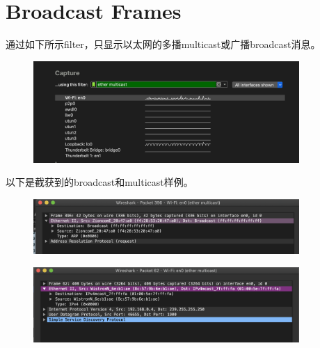 \documentclass{article}
\begin{document}
    \section{Broadcast Frames}
    通过如下所示filter，只显示以太网的多播multicast或广播broadcast消息。
    

 \begin{figure}[H]
        \centering
        \includegraphics[width=0.9\textwidth]{img/exp1cast.png}
        \caption{}
        \label{fig.6}
    \end{figure}
    以下是截获到的broadcast和multicast样例。
     \begin{figure}[H]
        \centering
        \includegraphics[width=0.9\textwidth]{img/exp1broad.png}
        \caption{}
        \label{fig.7}
    \end{figure}
    \begin{figure}[H]
        \centering
        \includegraphics[width=0.9\textwidth]{img/exp1multi.png}
        \caption{}
        \label{fig.8}
    \end{figure}
  
\end{document}
